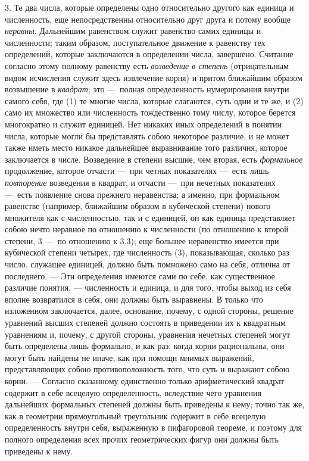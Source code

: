 {3. Те два числа, которые определены одно относительно другого как единица и
численность, еще непосредственны относительно друг друга и потому вообще
{\em неравны}. Дальнейшим равенством служит равенство
самих единицы и численности; таким образом, поступательное движение к
равенству тех определений, которые заключаются в определении числа,
завершено. Считание согласно этому полному равенству есть
{\em возведение в степень} (отрицательным видом
исчисления служит здесь извлечение корня) и притом ближайшим образом
возвышение в {\em квадрат}; это —~полная определенность
нумерирования внутри самого себя, где (1) те многие числа, которые
слагаются, суть одни и те же, и (2) само их множество или численность
тождественно тому числу, которое берется многократно и служит единицей. Нет
никаких иных определений в понятии числа, которые могли бы представлять
собою некоторое различие, и не может также иметь место никакое дальнейшее
выравнивание того различия, которое заключается в числе. Возведение в
степени высшие, чем вторая, есть {\em формальное}
продолжение, которое отчасти —~при четных показателях —~есть лишь
{\em повторение} возведения в квадрат, и отчасти —~при
нечетных показателях —~есть появление снова прежнего неравенства; а именно,
при формальном равенстве (например, ближайшим образом в кубической степени)
нового множителя как с численностью, так и с единицей, он как единица
представляет собою нечто неравное по отношению к численности (по отношению
к второй степени, 3 —~по отношению к 3.3); еще большее неравенство имеется
при кубической степени четырех, где численность (3), показывающая, сколько
раз число, служащее единицей, должно быть помножено само на себя, отлична
от последнего. — Эти определения имеются сами по себе, как существенное
различие понятия, — численность и единица, и для того, чтобы выход из себя
вполне возвратился в себя, они должны быть выравнены. В только что
изложенном заключается, далее, основание, почему, с одной стороны, решение
уравнений высших степеней должно состоять в приведении их к квадратным
уравнениям и, почему, с другой стороны, уравнения нечетных степеней могут
быть определены лишь формально, и как раз, когда корни рациональны, они
могут быть найдены не иначе, как при помощи мнимых выражений,
представляющих собою противоположность того, что суть и выражают собою
корни. — Согласно сказанному единственно только арифметический квадрат
содержит в себе всецелую определенность, вследствие чего уравнения
дальнейших формальных степеней должны быть приведены к нему; точно так же,
как в геометрии прямоугольный треугольник содержит в себе всецелую
определенность внутри себя, выраженную в пифагоровой теореме, и поэтому для
полного определения всех прочих геометрических фигур они должны быть
приведены к нему.

}
